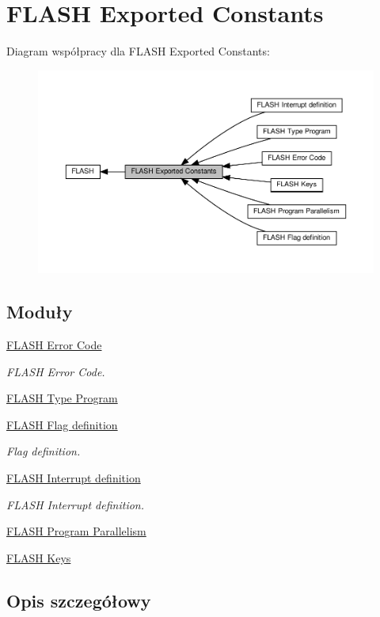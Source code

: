 \hypertarget{group___f_l_a_s_h___exported___constants}{}\section{F\+L\+A\+SH Exported Constants}
\label{group___f_l_a_s_h___exported___constants}
Diagram współpracy dla F\+L\+A\+SH Exported Constants\+:\nopagebreak
\begin{figure}[H]
\begin{center}
\leavevmode
\includegraphics[width=350pt]{group___f_l_a_s_h___exported___constants}
\end{center}
\end{figure}
\subsection*{Moduły}
\begin{DoxyCompactItemize}
\item 
\hyperlink{group___f_l_a_s_h___error___code}{F\+L\+A\+S\+H Error Code}
\begin{DoxyCompactList}\small\item\em F\+L\+A\+SH Error Code. \end{DoxyCompactList}\item 
\hyperlink{group___f_l_a_s_h___type___program}{F\+L\+A\+S\+H Type Program}
\item 
\hyperlink{group___f_l_a_s_h___flag__definition}{F\+L\+A\+S\+H Flag definition}
\begin{DoxyCompactList}\small\item\em Flag definition. \end{DoxyCompactList}\item 
\hyperlink{group___f_l_a_s_h___interrupt__definition}{F\+L\+A\+S\+H Interrupt definition}
\begin{DoxyCompactList}\small\item\em F\+L\+A\+SH Interrupt definition. \end{DoxyCompactList}\item 
\hyperlink{group___f_l_a_s_h___program___parallelism}{F\+L\+A\+S\+H Program Parallelism}
\item 
\hyperlink{group___f_l_a_s_h___keys}{F\+L\+A\+S\+H Keys}
\end{DoxyCompactItemize}


\subsection{Opis szczegółowy}
